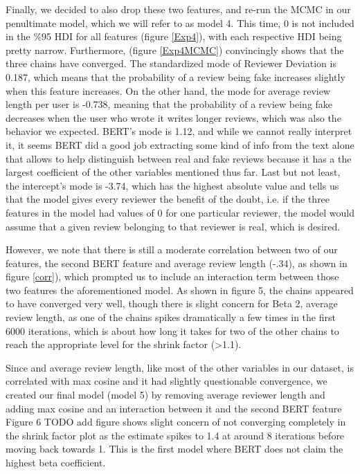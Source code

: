 Finally, we decided to also drop these two features, and re-run the MCMC in our penultimate model, which we will refer to as model 4. This time, 0 is not included in the \%95 HDI for all features (figure \ref{Exp4}), with each respective HDI being pretty narrow. Furthermore, (figure \ref{Exp4MCMC}) convincingly shows that the three chains have converged. The standardized mode of Reviewer Deviation is 0.187, which means that the probability of a review being fake increases slightly when this feature increases. On the other hand, the mode for average review length per user is -0.738, meaning that the probability of a review being fake decreases when the user who wrote it writes longer reviews, which was also the behavior we expected. BERT's mode is 1.12, and while we cannot really interpret it, it seems BERT did a good job extracting some kind of info from the text alone that allows to help distinguish between real and fake reviews because it has a the largest coefficient of the other variables mentioned thus far. Last but not least, the intercept's mode is -3.74, which has the highest absolute value and tells us that the model gives every reviewer the benefit of the doubt, i.e. if the three features in the model had values of 0 for one particular reviewer, the model would assume that a given review belonging to that reviewer is real, which is desired.

However, we note that there is still a moderate correlation between two of our features, the second BERT feature and average review length (-.34), as shown in figure \ref{corr}), which prompted us to include an interaction term between those two features the aforementioned model. As shown in figure 5, the chains appeared to have converged very well, though there is slight concern for Beta 2, average review length, as one of the chains spikes dramatically a few times in the first 6000 iterations, which is about how long it takes for two of the other chains to reach the appropriate level for the shrink factor (>1.1). 

Since and average review length, like most of the other variables in our dataset, is correlated with max cosine and it had slightly questionable convergence, we created our final model (model 5) by removing average reviewer length and adding max cosine and an interaction between it and the second BERT feature Figure 6 TODO add figure shows slight concern of not converging completely in the shrink factor plot as the estimate spikes to 1.4 at around 8 iterations before moving back towards 1. This is the first model where BERT does not claim the highest beta coefficient. 
\vspace{2mm}

